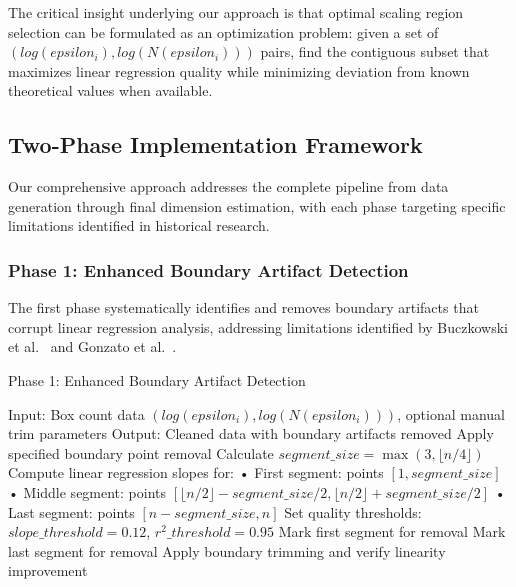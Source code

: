 \documentclass[preprint,12pt]{elsarticle}
\def\textbf#1{#1}%
\def\epsilon{epsilon}%
\begin{document}
The critical insight underlying our approach is that optimal scaling region selection can be formulated as an optimization problem: given a set of $(log(\epsilon_i), log(N(\epsilon_i)))$ pairs, find the contiguous subset that maximizes linear regression quality while minimizing deviation from known theoretical values when available.

\subsection{Two-Phase Implementation Framework}

Our comprehensive approach addresses the complete pipeline from data generation through final dimension estimation, with each phase targeting specific limitations identified in historical research.

\subsubsection{Phase 1: Enhanced Boundary Artifact Detection}

The first phase systematically identifies and removes boundary artifacts that corrupt linear regression analysis, addressing limitations identified by Buczkowski et al.~\cite{buczkowski1998} and Gonzato et al.~\cite{gonzato1998}.

\begin{algorithm}[!htbp]
\caption{Phase 1: Enhanced Boundary Artifact Detection}
\begin{algorithmic}[1]
\State \textbf{Input:} Box count data $(log(\epsilon_i), log(N(\epsilon_i)))$, optional manual trim parameters
\State \textbf{Output:} Cleaned data with boundary artifacts removed
\State
{}
    \State Apply specified boundary point removal
\EndIf
\State
{}
    \State Calculate $segment\_size = \max(3, \lfloor n/4 \rfloor)$
    \State Compute linear regression slopes for:
    \State \hspace{1em} • First segment: points $[1, segment\_size]$
    \State \hspace{1em} • Middle segment: points $[\lfloor n/2 \rfloor - segment\_size/2, \lfloor n/2 \rfloor + segment\_size/2]$
    \State \hspace{1em} • Last segment: points $[n - segment\_size, n]$
    \State
    \State Set quality thresholds: $slope\_threshold = 0.12$, $r^2\_threshold = 0.95$
    \State
        \State Mark first segment for removal
    \EndIf
        \State Mark last segment for removal
    \EndIf
    \State
    \State Apply boundary trimming and verify linearity improvement
\EndIf
\end{algorithmic}
\end{algorithm}
\end{document}
